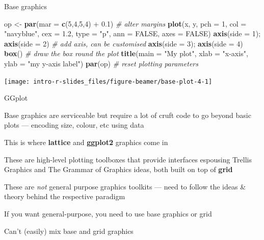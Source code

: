 \documentclass[10pt,ignorenonframetext,compress, aspectratio=169]{beamer}
\newenvironment{Shaded}{\begin{snugshade}}{\end{snugshade}}
\newcommand{\KeywordTok}[1]{\textcolor[rgb]{0.13,0.29,0.53}{\textbf{{#1}}}}
\newcommand{\DataTypeTok}[1]{\textcolor[rgb]{0.13,0.29,0.53}{{#1}}}
\newcommand{\DecValTok}[1]{\textcolor[rgb]{0.00,0.00,0.81}{{#1}}}
\newcommand{\FloatTok}[1]{\textcolor[rgb]{0.00,0.00,0.81}{{#1}}}
\newcommand{\StringTok}[1]{\textcolor[rgb]{0.31,0.60,0.02}{{#1}}}
\newcommand{\CommentTok}[1]{\textcolor[rgb]{0.56,0.35,0.01}{\textit{{#1}}}}
\newcommand{\OtherTok}[1]{\textcolor[rgb]{0.56,0.35,0.01}{{#1}}}
\newcommand{\NormalTok}[1]{{#1}}
\begin{document}
\begin{frame}[fragile]{Base graphics}

\scriptsize

\begin{Shaded}
\begin{Highlighting}[]
\NormalTok{op <-}\StringTok{ }\KeywordTok{par}\NormalTok{(}\DataTypeTok{mar =} \KeywordTok{c}\NormalTok{(}\DecValTok{5}\NormalTok{,}\DecValTok{4}\NormalTok{,}\DecValTok{5}\NormalTok{,}\DecValTok{4}\NormalTok{) +}\StringTok{ }\FloatTok{0.1}\NormalTok{)       }\CommentTok{# alter margins}
\KeywordTok{plot}\NormalTok{(x, y, }\DataTypeTok{pch =} \DecValTok{1}\NormalTok{, }\DataTypeTok{col =} \StringTok{"navyblue"}\NormalTok{, }\DataTypeTok{cex =} \FloatTok{1.2}\NormalTok{, }\DataTypeTok{type =} \StringTok{"p"}\NormalTok{, }\DataTypeTok{ann =} \OtherTok{FALSE}\NormalTok{, }\DataTypeTok{axes =} \OtherTok{FALSE}\NormalTok{)}
\KeywordTok{axis}\NormalTok{(}\DataTypeTok{side =} \DecValTok{1}\NormalTok{); }\KeywordTok{axis}\NormalTok{(}\DataTypeTok{side =} \DecValTok{2}\NormalTok{)          }\CommentTok{# add axis, can be customised}
\KeywordTok{axis}\NormalTok{(}\DataTypeTok{side =} \DecValTok{3}\NormalTok{); }\KeywordTok{axis}\NormalTok{(}\DataTypeTok{side =} \DecValTok{4}\NormalTok{)}
\KeywordTok{box}\NormalTok{()                                   }\CommentTok{# draw the box round the plot}
\KeywordTok{title}\NormalTok{(}\DataTypeTok{main =} \StringTok{"My plot"}\NormalTok{, }\DataTypeTok{xlab =} \StringTok{"x-axis"}\NormalTok{, }\DataTypeTok{ylab =} \StringTok{"my y-axis label"}\NormalTok{)}
\KeywordTok{par}\NormalTok{(op)                                 }\CommentTok{# reset plotting parameters}
\end{Highlighting}
\end{Shaded}

\begin{center}\texttt{[image: intro-r-slides\_files/figure-beamer/base-plot-4-1]} \end{center}

\normalsize

\end{frame}

\begin{frame}{GGplot}

Base graphics are serviceable but require a lot of cruft code to go
beyond basic plots --- encoding size, colour, etc using data

This is where \textbf{lattice} and \textbf{ggplot2} graphics come in

These are high-level plotting toolboxes that provide interfaces
espousing Trellis Graphics and The Grammar of Graphics ideas, both built
on top of \textbf{grid}

These are \emph{not} general purpose graphics toolkits --- need to
follow the ideas \& theory behind the respective paradigm

If you want general-purpose, you need to use base graphics or grid

Can't (easily) mix base and grid graphics

\end{frame}
\end{document}
